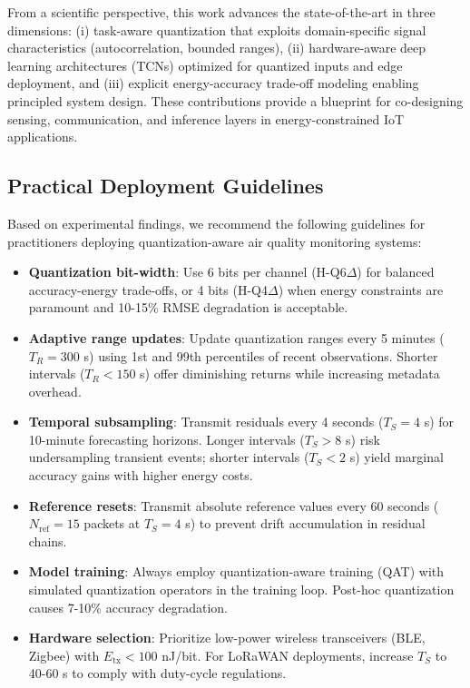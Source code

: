 From a scientific perspective, this work advances the state-of-the-art in three dimensions: (i) task-aware quantization that exploits domain-specific signal characteristics (autocorrelation, bounded ranges), (ii) hardware-aware deep learning architectures (TCNs) optimized for quantized inputs and edge deployment, and (iii) explicit energy-accuracy trade-off modeling enabling principled system design. These contributions provide a blueprint for co-designing sensing, communication, and inference layers in energy-constrained IoT applications.

\subsection{Practical Deployment Guidelines}

Based on experimental findings, we recommend the following guidelines for practitioners deploying quantization-aware air quality monitoring systems:

\begin{itemize}
\item \textbf{Quantization bit-width}: Use 6 bits per channel (H-Q6$\Delta$) for balanced accuracy-energy trade-offs, or 4 bits (H-Q4$\Delta$) when energy constraints are paramount and 10-15\% RMSE degradation is acceptable.

\item \textbf{Adaptive range updates}: Update quantization ranges every 5 minutes ($T_R = 300$ s) using 1st and 99th percentiles of recent observations. Shorter intervals ($T_R < 150$ s) offer diminishing returns while increasing metadata overhead.

\item \textbf{Temporal subsampling}: Transmit residuals every 4 seconds ($T_S = 4$ s) for 10-minute forecasting horizons. Longer intervals ($T_S > 8$ s) risk undersampling transient events; shorter intervals ($T_S < 2$ s) yield marginal accuracy gains with higher energy costs.

\item \textbf{Reference resets}: Transmit absolute reference values every 60 seconds ($N_{\text{ref}} = 15$ packets at $T_S = 4$ s) to prevent drift accumulation in residual chains.

\item \textbf{Model training}: Always employ quantization-aware training (QAT) with simulated quantization operators in the training loop. Post-hoc quantization causes 7-10\% accuracy degradation.

\item \textbf{Hardware selection}: Prioritize low-power wireless transceivers (BLE, Zigbee) with $E_{\text{tx}} < 100$ nJ/bit. For LoRaWAN deployments, increase $T_S$ to 40-60 s to comply with duty-cycle regulations.
\end{itemize}

